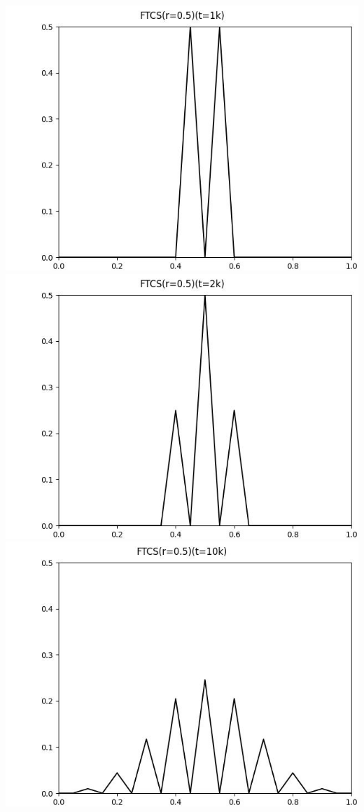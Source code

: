 \documentclass[12pt]{ctexart}
\begin{document}
\includegraphics[scale=0.35]{FTCS(r=0.5)(t=1k).jpg}
\includegraphics[scale=0.35]{FTCS(r=0.5)(t=2k).jpg}
\includegraphics[scale=0.35]{FTCS(r=0.5)(t=10k).jpg}
\end{document}
